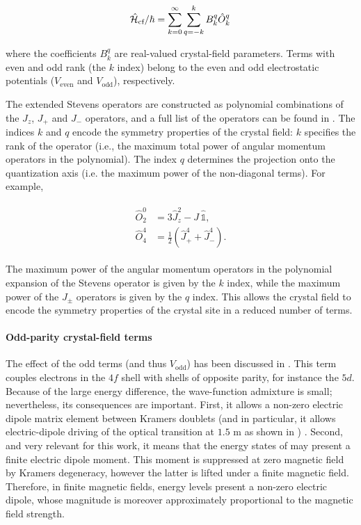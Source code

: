 \begin{equation}
    \hat{\mathcal{H}}_{\text{cf}} / \hbar = \sum_{k=0}^{\infty}\sum_{q=-k}^{k} B_k^q \hat{O}^q_k \,
\end{equation}

where the coefficients $B_k^q$ are real-valued crystal-field parameters. Terms with even and odd rank (the $k$ index) belong to the even and odd electrostatic potentials ($V_{\mathrm{even}}$ and $V_{\mathrm{odd}}$), respectively.

The extended Stevens operators are constructed as polynomial combinations of the $J_z$, $J_+$ and $J_-$ operators, and a full list of the operators can be found in . The indices $k$ and $q$ encode the symmetry properties of the crystal field: $k$ specifies the rank of the operator (i.e., the maximum total power of angular momentum operators in the polynomial). The index $q$ determines the projection onto the quantization axis (i.e. the maximum power of the non-diagonal terms). For example, 

\begin{align}
\begin{split}
    \hat{O}_2^0 &= 3 \hat{J}_z^2 - J\,\hat{\mathbb{1}}, \\
    \hat{O}_4^4 &= \tfrac{1}{2} \left( \hat{J}_+^4 + \hat{J}_-^4 \right).
\end{split}
\end{align}

The maximum power of the angular momentum operators in the polynomial expansion of the Stevens operator is given by the $k$ index, while the maximum power of the $J_\pm$ operators is given by the $q$ index. This allows the crystal field to encode the symmetry properties of the crystal site in a reduced number of terms. 

\paragraph{Odd-parity crystal-field terms} The effect of the odd terms (and thus $V_\mathrm{odd}$) has been discussed in . This term couples electrons in the $4f$ shell with shells of opposite parity, for instance the $5d$. Because of the large energy difference, the wave-function admixture is small; nevertheless, its consequences are important. First, it allows a non-zero electric dipole matrix element between Kramers doublets (and in particular, it allows electric-dipole driving of the optical transition at $1.5$ \textmu m as shown in ) \cite{judd_optical_1962a}. Second, and very relevant for this work, it means that the energy states of \Er may present a finite electric dipole moment. This moment is suppressed at zero magnetic field by Kramers degeneracy, however the latter is lifted under a finite magnetic field. Therefore, in finite magnetic fields, \Er energy levels present a non-zero electric dipole, whose magnitude is moreover approximately proportional to the magnetic field strength.

